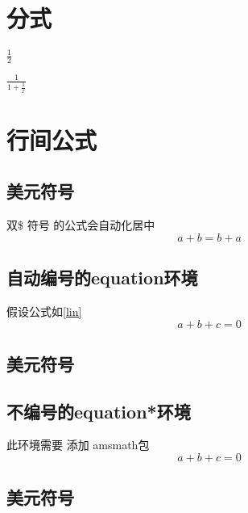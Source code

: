 \documentclass[UTF8]{article}
\begin{document}
	\section{分式}
	$\frac{1}{2}$
	
	$\frac{1}{1+\frac{1}{x}}$
	
	\section{行间公式}
	\subsection{美元符号}
	双\$ 符号 的公式会自动化居中
	$$a+b=b+a$$
	
	\subsection{自动编号的equation环境}
	假设公式如\ref{lin}
	\begin{equation}\label{lin}
		a+b+c=0
	\end{equation}
	\subsection{美元符号}
	
	\subsection{不编号的equation*环境}
	此环境需要 添加 amsmath包
	\begin{equation*}
	a+b+c=0
	\end{equation*}
	\subsection{美元符号}
	
\end{document}
